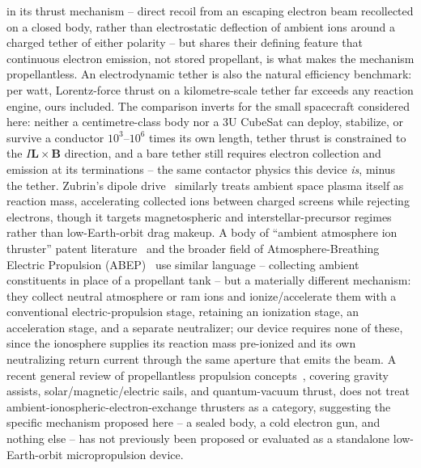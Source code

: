 \documentclass[11pt]{article}
\begin{document}
in its thrust mechanism -- direct recoil from an escaping electron beam
recollected on a closed body, rather than electrostatic deflection of
ambient ions around a charged tether of either polarity -- but shares their
defining feature that continuous electron emission, not stored propellant,
is what makes the mechanism propellantless. An electrodynamic tether is
also the natural efficiency benchmark: per watt, Lorentz-force thrust on a
kilometre-scale tether far exceeds any reaction engine, ours included. The
comparison inverts for the small spacecraft considered here: neither a
centimetre-class body nor a 3U CubeSat can deploy, stabilize, or survive a
conductor $10^{3}$--$10^{6}$ times its own length,
tether thrust is constrained to the $I\mathbf{L}\times\mathbf{B}$
direction, and a bare tether still requires electron collection and
emission at its terminations -- the same contactor physics this device
\emph{is}, minus the tether. Zubrin's dipole
drive~\cite{zub17} similarly treats ambient space plasma itself as reaction
mass, accelerating collected ions between charged screens while rejecting
electrons, though it targets magnetospheric and interstellar-precursor
regimes rather than low-Earth-orbit drag makeup. A body of ``ambient
atmosphere ion thruster'' patent literature~\cite{dre07} and the broader field
of Atmosphere-Breathing Electric Propulsion (ABEP)~\cite{zhe20} use similar
language -- collecting ambient constituents in place of a propellant tank --
but a materially different mechanism: they collect neutral atmosphere or ram
ions and ionize/accelerate them with a conventional electric-propulsion
stage, retaining an ionization stage, an acceleration stage, and a separate
neutralizer; our device requires none of these, since the ionosphere supplies
its reaction mass pre-ionized and its own neutralizing return current through
the same aperture that emits the beam. A recent general review of
propellantless propulsion concepts~\cite{kez25}, covering gravity assists,
solar/magnetic/electric sails, and quantum-vacuum thrust, does not treat
ambient-ionospheric-electron-exchange thrusters as a category, suggesting the
specific mechanism proposed here -- a sealed body, a cold electron gun, and
nothing else -- has not previously been proposed or evaluated as a standalone
low-Earth-orbit micropropulsion device.
\end{document}
